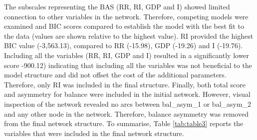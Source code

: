 \documentclass[
  english,
  man,floatsintext]{apa6}
\begin{document}
The subscales representing the BAS (RR, RI, GDP and I) showed limited connection to other variables in the network.
Therefore, competing models were examined and BIC scores compared to establish the model with the best fit to the data (values are shown relative to the highest value).
RI provided the highest BIC value (-3,563.13), compared to RR (-15.98), GDP (-19.26) and I (-19.76).
Including all the variables (RR, RI, GDP and I) resulted in a significantly lower score -900.12) indicating that including all the variables was not beneficial to the model structure and did not offset the cost of the additional parameters. Therefore, only RI was included in the final structure.
Finally, both total score and asymmetry for balance were included in the initial network. However, visual inspection of the network revealed no arcs between bal\_asym\_1 or bal\_asym\_2 and any other node in the network.
Therefore, balance asymmetry was removed from the final network structure.
To summarise, Table \ref{tab:table3} reports the variables that were included in the final network structure.
\end{document}
